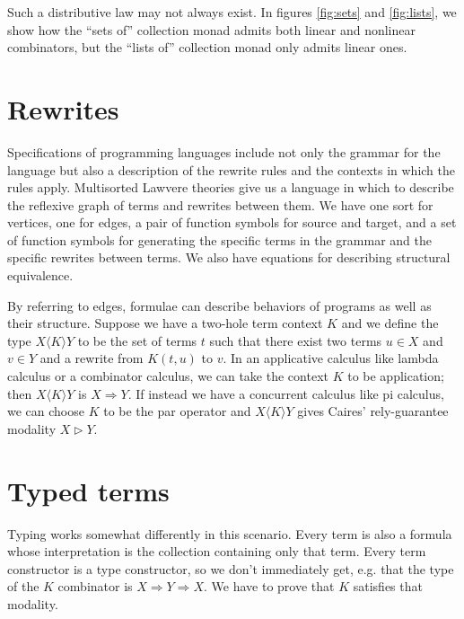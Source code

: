 \documentclass[sigplan,9pt,review,anonymous]{acmart}\settopmatter{printfolios=true,printccs=false,printacmref=false}
\begin{document}
Such a distributive law may not always exist.  In figures \ref{fig:sets} and \ref{fig:lists}, we show how the ``sets of'' collection monad admits both linear and nonlinear combinators, but the ``lists of'' collection monad only admits linear ones.

\section{Rewrites}
Specifications of programming languages include not only the grammar for the language but also a description of the rewrite rules and the contexts in which the rules apply.  Multisorted Lawvere theories give us a language in which to describe the reflexive graph of terms and rewrites between them.  We have one sort for vertices, one for edges, a pair of function symbols for source and target, and a set of function symbols for generating the specific terms in the grammar and the specific rewrites between terms.  We also have equations for describing structural equivalence.

By referring to edges, formulae can describe behaviors of programs as well as their structure.  Suppose we have a two-hole term context $K$ and we define the type $X\langle K\rangle Y$ to be the set of terms $t$ such that there exist two terms $u\in X$ and $v \in Y$ and a rewrite from $K(t,u)$ to $v.$  In an applicative calculus like lambda calculus or a combinator calculus, we can take the context $K$ to be application; then $X\langle K\rangle Y$ is $X \Rightarrow Y.$  If instead we have a concurrent calculus like pi calculus, we can choose $K$ to be the par operator and $X\langle K\rangle Y$ gives Caires' rely-guarantee modality $X\triangleright Y$.


\section{Typed terms}
Typing works somewhat differently in this scenario.  Every term is also a formula whose interpretation is the collection containing only that term.  Every term constructor is a type constructor, so we don't immediately get, e.g. that the type of the $K$ combinator is $X \Rightarrow Y \Rightarrow X.$  We have to prove that $K$ satisfies that modality.
\end{document}
